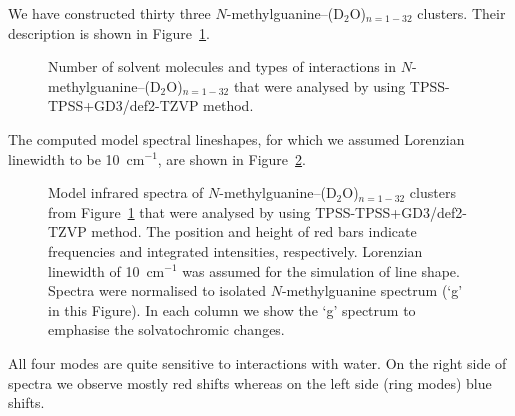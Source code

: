 \documentclass[a4paper,titlepage,twoside,fleqn,12pt]{book}
\begin{document}
\begin{refsection}
We have constructed thirty three $N$-methylguanine--(D$_2$O)$_{n=1-32}$ clusters.
Their description is shown in Figure~\ref{f:guanine-clusters-description}.
%
\begin{figure}[t!]
\centering
\setlength\fboxsep{0.4pt}
\setlength\fboxrule{0.5pt}
\caption{
Number of solvent molecules and 
types of interactions in $N$-methylguanine--(D$_2$O)$_{n=1-32}$ that were analysed
by using TPSS-TPSS+GD3/def2-TZVP method.
\label{f:guanine-clusters-description}}
\end{figure}
%
The computed model spectral lineshapes, for which we assumed Lorenzian linewidth to be 10~cm$^{-1}$,
are shown in Figure~\ref{f:guanine-clusters-spectra}.
%
\begin{figure}[t!]
\centering
\setlength\fboxsep{0.4pt}
\setlength\fboxrule{0.5pt}
\caption{
Model infrared spectra
of $N$-methylguanine--(D$_2$O)$_{n=1-32}$ clusters from 
Figure~\ref{f:guanine-clusters-description} that were analysed
by using TPSS-TPSS+GD3/def2-TZVP method. The position and height of red bars
indicate frequencies and integrated intensities, respectively. Lorenzian linewidth of 10~cm$^{-1}$
was assumed for the simulation of line shape. Spectra were normalised to
isolated $N$-methylguanine spectrum (`g' in this Figure). In each column we show
the `g' spectrum to emphasise the solvatochromic changes.
\label{f:guanine-clusters-spectra}}
\end{figure}
%
All four modes are quite sensitive to interactions with water. On the right side
of spectra we observe mostly red shifts whereas on the left side (ring modes)
blue shifts.


\end{refsection}
\end{document}
